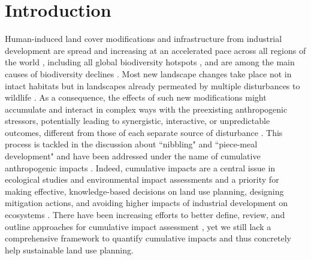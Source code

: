 \documentclass[titlepage]{article}
\begin{document}
\begin{abstract}

\end{abstract}

\section{Introduction}

Human-induced land cover modifications and infrastructure from industrial development are spread and increasing at an accelerated pace across all regions of the world \citep{venter_sixteen_2016,ibisch_global_2016}, including all global biodiversity hotspots \citep{sloan_remaining_2014}, and are among the main causes of biodiversity declines \citep{benitez-lopez_impacts_2010,newbold_global_2015}. Most new landscape changes take place not in intact habitats but in landscapes already permeated by multiple disturbances to wildlife  \citep{barber_roads_2014,kowe_quantitative_2020}. As a consequence, the effects of such new modifications might accumulate and interact in complex ways with the preexisting anthropogenic stressors, potentially leading to synergistic, interactive, or unpredictable outcomes, different from those of each separate source of disturbance \citep{naugle_unifying_2011}. This process is tackled in the discussion about ``nibbling" and ``piece-meal development" \citep{nellemann_progressive_2003} and have been addressed under the name of cumulative anthropogenic impacts \citep[Box 1; ][]{gillingham_integration_2016}. Indeed, cumulative impacts are a central issue in ecological studies and environmental impact assessments and a priority for making effective, knowledge-based decisions on land use planning, designing mitigation actions, and avoiding higher impacts of industrial development on ecosystems \citep{krausman_cumulative_2011, laurance_roads_2017}. There have been increasing efforts to better define, review, and outline approaches for cumulative impact assessment \citep{naugle_unifying_2011,gillingham_integration_2016}, yet we still lack a comprehensive framework to quantify cumulative impacts and thus concretely help sustainable land use planning.
\end{document}
